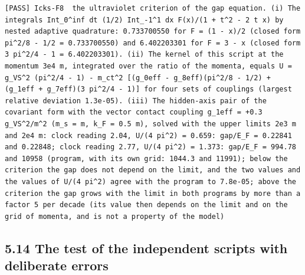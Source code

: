 \documentclass[
  10pt,
]{article}
\begin{document}
\begin{verbatim}
[PASS] Icks-F8  the ultraviolet criterion of the gap equation. (i) The integrals Int_0^inf dt (1/2) Int_-1^1 dx F(x)/(1 + t^2 - 2 t x) by nested adaptive quadrature: 0.733700550 for F = (1 - x)/2 (closed form pi^2/8 - 1/2 = 0.733700550) and 6.402203301 for F = 3 - x (closed form 3 pi^2/4 - 1 = 6.402203301). (ii) The kernel of this script at the momentum 3e4 m, integrated over the ratio of the momenta, equals U = g_VS^2 (pi^2/4 - 1) - m_ct^2 [(g_0eff - g_8eff)(pi^2/8 - 1/2) + (g_1eff + g_7eff)(3 pi^2/4 - 1)] for four sets of couplings (largest relative deviation 1.3e-05). (iii) The hidden-axis pair of the covariant form with the vector contact coupling g_1eff = +0.3 g_VS^2/m^2 (m_s = m, k_F = 0.5 m), solved with the upper limits 2e3 m and 2e4 m: clock reading 2.04, U/(4 pi^2) = 0.659: gap/E_F = 0.22841 and 0.22848; clock reading 2.77, U/(4 pi^2) = 1.373: gap/E_F = 994.78 and 10958 (program, with its own grid: 1044.3 and 11991); below the criterion the gap does not depend on the limit, and the two values and the values of U/(4 pi^2) agree with the program to 7.8e-05; above the criterion the gap grows with the limit in both programs by more than a factor 5 per decade (its value then depends on the limit and on the grid of momenta, and is not a property of the model)
\end{verbatim}

\hypertarget{the-test-of-the-independent-scripts-with-deliberate-errors}{%
\subsection{5.14 The test of the independent scripts with deliberate
errors}\label{the-test-of-the-independent-scripts-with-deliberate-errors}}
\end{document}
